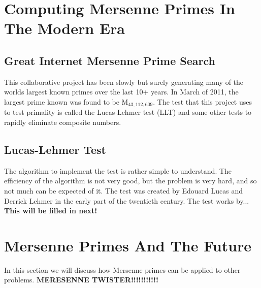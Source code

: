 \section{Computing Mersenne Primes In The Modern Era}
\subsection{Great Internet Mersenne Prime Search}
This collaborative project has been slowly but surely generating many of the worlds largest known primes over the last 10+ years.  In March of 2011, the largest prime known was found to be M$_{43,112,609}$. The test that this project uses to test primality is called the Lucas-Lehmer test (LLT) and some other tests to rapidly eliminate composite numbers.
\subsection{Lucas-Lehmer Test}
The algorithm to implement the test is rather simple to understand.  The efficiency of the algorithm is not very good, but the problem is very hard, and so not much can be expected of it.  The test was created by  Edouard Lucas and Derrick Lehmer in the early part of the twentieth century.  The test works by... \textbf{This will be filled in next!}




\section{Mersenne Primes And The Future}
In this section we will discuss how Mersenne primes can be applied to other problems.
\textbf{MERESENNE TWISTER!!!!!!!!!!!}
